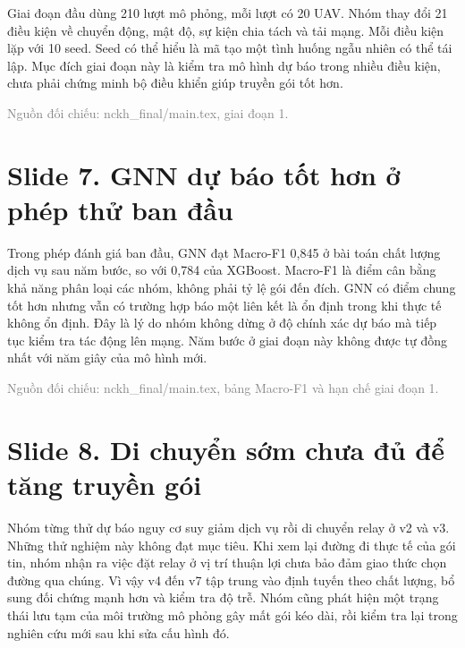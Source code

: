 Giai đoạn đầu dùng 210 lượt mô phỏng, mỗi lượt có 20 UAV. Nhóm thay đổi 21 điều kiện về chuyển động, mật độ, sự kiện chia tách và tải mạng. Mỗi điều kiện lặp với 10 seed. Seed có thể hiểu là mã tạo một tình huống ngẫu nhiên có thể tái lập. Mục đích giai đoạn này là kiểm tra mô hình dự báo trong nhiều điều kiện, chưa phải chứng minh bộ điều khiển giúp truyền gói tốt hơn.

{\small\textcolor{gray}{Nguồn đối chiếu: nckh\_final/main.tex, giai đoạn 1.}}




\section*{Slide 7. GNN dự báo tốt hơn ở phép thử ban đầu}


Trong phép đánh giá ban đầu, GNN đạt Macro-F1 0,845 ở bài toán chất lượng dịch vụ sau năm bước, so với 0,784 của XGBoost. Macro-F1 là điểm cân bằng khả năng phân loại các nhóm, không phải tỷ lệ gói đến đích. GNN có điểm chung tốt hơn nhưng vẫn có trường hợp báo một liên kết là ổn định trong khi thực tế không ổn định. Đây là lý do nhóm không dừng ở độ chính xác dự báo mà tiếp tục kiểm tra tác động lên mạng. Năm bước ở giai đoạn này không được tự đồng nhất với năm giây của mô hình mới.

{\small\textcolor{gray}{Nguồn đối chiếu: nckh\_final/main.tex, bảng Macro-F1 và hạn chế giai đoạn 1.}}




\section*{Slide 8. Di chuyển sớm chưa đủ để tăng truyền gói}


Nhóm từng thử dự báo nguy cơ suy giảm dịch vụ rồi di chuyển relay ở v2 và v3. Những thử nghiệm này không đạt mục tiêu. Khi xem lại đường đi thực tế của gói tin, nhóm nhận ra việc đặt relay ở vị trí thuận lợi chưa bảo đảm giao thức chọn đường qua chúng. Vì vậy v4 đến v7 tập trung vào định tuyến theo chất lượng, bổ sung đối chứng mạnh hơn và kiểm tra độ trễ. Nhóm cũng phát hiện một trạng thái lưu tạm của môi trường mô phỏng gây mất gói kéo dài, rồi kiểm tra lại trong nghiên cứu mới sau khi sửa cấu hình đó.

